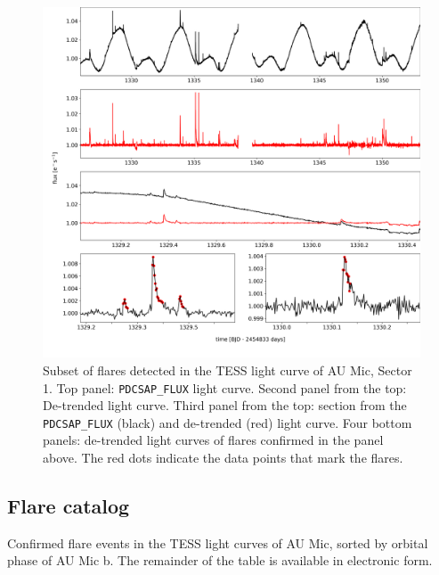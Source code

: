 \documentclass[fleqn,usenatbib,letters]{mnras}%
\begin{document}
\begin{figure}
\includegraphics[width=\hsize]{figures/aumic_illustrate_flares.png} 
\caption{Subset of flares detected in the TESS light curve of AU Mic, Sector 1. Top panel: \texttt{PDCSAP\_FLUX} light curve. Second panel from the top: De-trended light curve. Third panel from the top: section from the \texttt{PDCSAP\_FLUX} (black) and de-trended (red) light curve. Four bottom panels: de-trended light curves of flares confirmed in the panel above. The red dots indicate the data points that mark the flares.}
\label{fig:illustrate_detrend}
\end{figure}

\subsection{Flare catalog}
\label{sec:flarecatalog}
\begin{table}
\caption{Confirmed flare events in the TESS light curves of AU Mic, sorted by orbital phase of AU Mic b. The remainder of the table is available in electronic form.}
\centering

\label{tab:flares}
\end{table}
\end{document}
